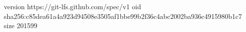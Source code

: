 version https://git-lfs.github.com/spec/v1
oid sha256:c85dea61a4a923d94508e3505af1bbe99b2f36c4abc2002ba936c4915980b1c7
size 201599
